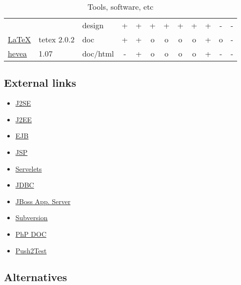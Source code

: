 \begin{table}[htbp]
\begin{tabular}[t]{|lll|cc|ccccccc|}
    &
    & 
    design %
    & 
    +  %
    & 
    +  %
    &
    + %
    &
    + %
    &
    + %
    &
    + %
    & 
    + %
    &
    - %
    &
    - %
    \\
    \href{http://www.latex-project.org/}{\LaTeX}
    &
    tetex 2.0.2 %
    & 
    doc %
    & 
    +  %
    & 
    + %
    &
    o %
    &
    o %
    &
    o %
    &
    o %
    & 
    + %
    &
    o %
    &
    - %
    \\
    \href{http://pauillac.inria.fr/~maranget/hevea}{hevea}
    &
    1.07 %
    & 
    doc/html 
    & 
    - %
    & 
    + %
    &
    o %
    &
    o %
    &
    o %
    &
    o %
    & 
    + %
    &
    - %
    &
    - %
    \\\hline
  \end{tabular}
  \caption{Tools, software, etc}
  \label{tab:tools}
\end{table}

\subsection*{External links}

\begin{itemize}
\item \href{http://java.sun.com/j2se/index.jsp}{J2SE}
\item \href{http://java.sun.com/j2ee/index.jsp}{J2EE}
\item \href{http://java.sun.com/products/ejb/}{EJB}
\item \href{http://java.sun.com/products/jsp/index.jsp}{JSP}
\item \href{http://java.sun.com/products/servlet/index.jsp}{Servelets}
\item \href{http://www.mysql.com/products/connector/j/}{JDBC}
\item \href{http://www.jboss.org/}{JBoss App. Server}
\item \href{http://subversion.tigris.org/}{Subversion}
\item \href{http://www.phpdoc.org/docs/HTMLSmartyConverter/default/phpDocumentor/tutorial_tags.pkg.html}{PhP DOC}
\item \href{http://www.pushtotest.com/}{Push2Test}
\end{itemize}




\subsection*{Alternatives}


